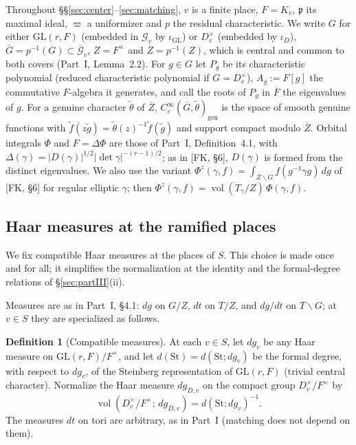 \documentclass[12pt]{article}
\newcommand{\ov}[1]{\overline{#1}}
\newcommand{\fp}{\mathfrak{p}}
\newcommand{\gen}{\mathrm{gen}}
\newcommand{\vol}{\operatorname{vol}}
\newcommand{\GL}{\mathrm{GL}}
\newcommand{\St}{\mathrm{St}}
\newcommand{\Gb}{\ov{G}}
\newcommand{\Zb}{\ov{Z}}
\newcommand{\cG}{\mathcal{G}}
\newcommand{\cGb}{\ov{\mathcal{G}}}
\newcommand{\iD}{\iota_D}
\newcommand{\iG}{\iota_{\GL}}
\theoremstyle{plain}
\theoremstyle{definition}
\newtheorem{definition}[theorem]{Definition}
\begin{document}
Throughout \S\S\ref{sec:center}--\ref{sec:matching}, $v$ is a finite place, $F=K_v$, $\fp$ its maximal ideal, $\varpi$ a uniformizer and $p$ the residual characteristic. We write $G$ for either $\GL(r,F)$ (embedded in $\cG_v$ by $\iG$) or $D_v^\times$ (embedded by $\iD$), $\Gb=p^{-1}(G)\subset\cGb_v$, $Z=F^\times$ and $\Zb=p^{-1}(Z)$, which is central and common to both covers (Part~I, Lemma~2.2). For $g\in G$ let $P_g$ be its characteristic polynomial (reduced characteristic polynomial if $G=D_v^\times$), $A_g:=F[g]$ the commutative $F$-algebra it generates, and call the roots of $P_g$ in $\ov F$ the eigenvalues of $g$. For a genuine character $\tilde\theta$ of $\Zb$, $C_c^\infty(\Gb,\tilde\theta)_\gen$ is the space of smooth genuine functions with $\tilde f(z\tilde g)=\tilde\theta(z)^{-1}\tilde f(\tilde g)$ and support compact modulo $\Zb$. Orbital integrals $\Phi$ and $F=\Delta\Phi$ are those of Part~I, Definition~4.1, with $\Delta(\gamma)=|D(\gamma)|^{1/2}|\det\gamma|^{-(r-1)/2}$; as in [FK, \S6], $D(\gamma)$ is formed from the distinct eigenvalues. We also use the variant $\Phi^z(\gamma,f)=\int_{Z\backslash G}f(g^{-1}\gamma g)\,dg$ of [FK, \S6] for regular elliptic $\gamma$; then $\Phi^z(\gamma,f)=\vol(T_\gamma/Z)\,\Phi(\gamma,f)$.

\subsection{Haar measures at the ramified places}\label{subsec:measures}
We fix compatible Haar measures at the places of $S$. This choice is made once and for all; it simplifies the normalization at the identity and the formal-degree relations of \S\ref{sec:partIII}(ii).

Measures are as in Part~I, \S4.1: $dg$ on $G/Z$, $dt$ on $T/Z$, and $dg/dt$ on $T\backslash G$; at $v\in S$ they are specialized as follows.

\begin{definition}[Compatible measures]\label{def:measures}
At each $v\in S$, let $dg_v$ be any Haar measure on $\GL(r,F)/F^\times$, and let $d(\St)=d(\St;dg_v)$ be the formal degree, with respect to $dg_v$, of the Steinberg representation of $\GL(r,F)$ (trivial central character). Normalize the Haar measure $dg_{D,v}$ on the compact group $D_v^\times/F^\times$ by
\[ \vol(D_v^\times/F^\times;\,dg_{D,v})=d(\St;dg_v)^{-1}. \]
The measures $dt$ on tori are arbitrary, as in Part~I (matching does not depend on them).
\end{definition}
\end{document}

